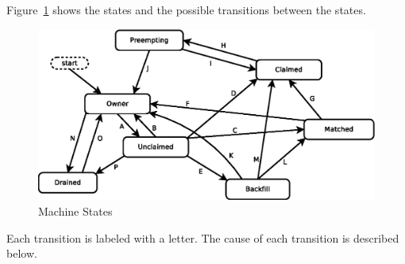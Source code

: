 Figure~\ref{fig:machine-states} shows
the states and the possible transitions between the states.


\begin{figure}[hbt]
\centering
\includegraphics{admin-man/states.eps}
\caption{\label{fig:machine-states}Machine States}
\end{figure}

Each transition is labeled with a letter.
The cause of each transition is described below.


